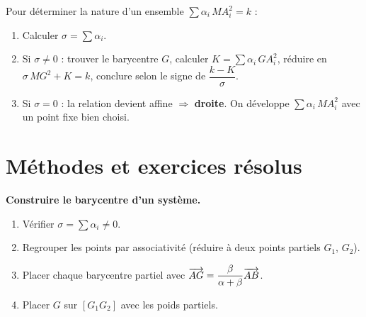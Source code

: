 \begin{figure}[htbp]
\centering
{}
\end{figure}

\begin{astucebac}
	Pour déterminer la nature d'un ensemble $\sum \alpha_i\,MA_i^2 = k$ :
	\begin{enumerate}
		\item Calculer $\sigma = \sum \alpha_i$.
		\item Si $\sigma \neq 0$ : trouver le barycentre $G$, calculer
		$K = \sum \alpha_i\,GA_i^2$, réduire en $\sigma\,MG^2 + K = k$, conclure
		selon le signe de $\dfrac{k-K}{\sigma}$.
		\item Si $\sigma = 0$ : la relation devient affine $\Rightarrow$
		\textbf{droite}. On développe $\sum \alpha_i\,MA_i^2$ avec un point fixe
		bien choisi.
	\end{enumerate}
\end{astucebac}


\section{Méthodes et exercices résolus}

\begin{methode}
	\textbf{Construire le barycentre d'un système.}
	\begin{enumerate}
		\item Vérifier $\sigma = \sum \alpha_i \neq 0$.
		\item Regrouper les points par associativité (réduire à deux points
		partiels $G_1$, $G_2$).
		\item Placer chaque barycentre partiel avec $\overrightarrow{AG} = \dfrac{\beta}{\alpha+\beta}\overrightarrow{AB}$.
		\item Placer $G$ sur $[G_1G_2]$ avec les poids partiels.
	\end{enumerate}
\end{methode}

